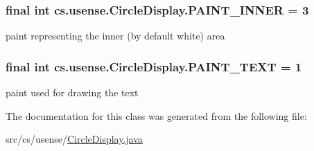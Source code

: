 \subsubsection[{P\+A\+I\+N\+T\+\_\+\+I\+N\+N\+E\+R}]{\setlength{\rightskip}{0pt plus 5cm}final int cs.\+usense.\+Circle\+Display.\+P\+A\+I\+N\+T\+\_\+\+I\+N\+N\+E\+R = 3\hspace{0.3cm}{\ttfamily [static]}}\label{classcs_1_1usense_1_1_circle_display_afe7dda2665396e0c6f1e43913b9cea99}
paint representing the inner (by default white) area \hypertarget{classcs_1_1usense_1_1_circle_display_a697352d619ac6f54ae4c2811e61a0c61}{}
\subsubsection[{P\+A\+I\+N\+T\+\_\+\+T\+E\+X\+T}]{\setlength{\rightskip}{0pt plus 5cm}final int cs.\+usense.\+Circle\+Display.\+P\+A\+I\+N\+T\+\_\+\+T\+E\+X\+T = 1\hspace{0.3cm}{\ttfamily [static]}}\label{classcs_1_1usense_1_1_circle_display_a697352d619ac6f54ae4c2811e61a0c61}
paint used for drawing the text 

The documentation for this class was generated from the following file\+:\begin{DoxyCompactItemize}
\item 
src/cs/usense/\hyperlink{_circle_display_8java}{Circle\+Display.\+java}\end{DoxyCompactItemize}
